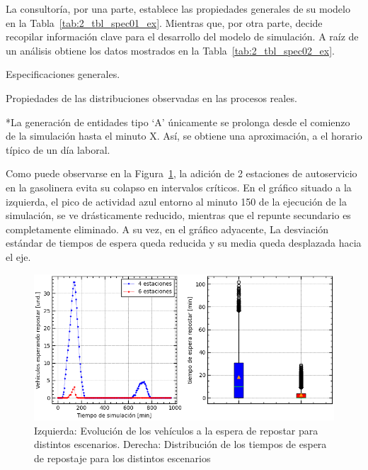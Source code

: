 La consultoría, por una parte, establece
las propiedades generales de su modelo en la Tabla~\ref{tab:2_tbl_spec01_ex}.
Mientras que, por otra parte, decide recopilar información clave
para el desarrollo del modelo de simulación.
A raíz de un análisis obtiene los datos mostrados en la Tabla~\ref{tab:2_tbl_spec02_ex}.

\begin{table}
	\centering
	\caption{Especificaciones generales.}
	
	\label{tab:2_tbl_spec01_ex}
\end{table}
	
\begin{table}
	\centering
	\caption{Propiedades de las distribuciones observadas en las procesos reales.}
	
	\footnotesize{*La generación de entidades tipo `A' únicamente se prolonga desde el comienzo de la simulación hasta el minuto X.
	Así, se obtiene una aproximación, a el horario típico de un día laboral.}
	\label{tab:2_tbl_spec02_ex}
\end{table}

Como puede observarse en la Figura~\ref{fig:2_fig_example_01},
la adición de 2 estaciones de autoservicio en la gasolinera
evita su colapso en intervalos críticos.
En el gráfico situado a la izquierda,
el pico de actividad azul entorno al minuto 150 de la ejecución de la simulación,
se ve drásticamente reducido, mientras que el repunte secundario es completamente eliminado.
A su vez, en el gráfico adyacente,
La desviación estándar de tiempos de espera queda reducida
y su media queda desplazada hacia el eje.

\begin{figure}
	\begin{center}
		\includegraphics[width=\textwidth]{fig/2_fig_example_01}
	\end{center}
	\caption{Izquierda: Evolución de los vehículos a la espera de repostar para distintos escenarios. Derecha: Distribución de los tiempos de espera de repostaje para los distintos escenarios}
	\label{fig:2_fig_example_01}
\end{figure}

